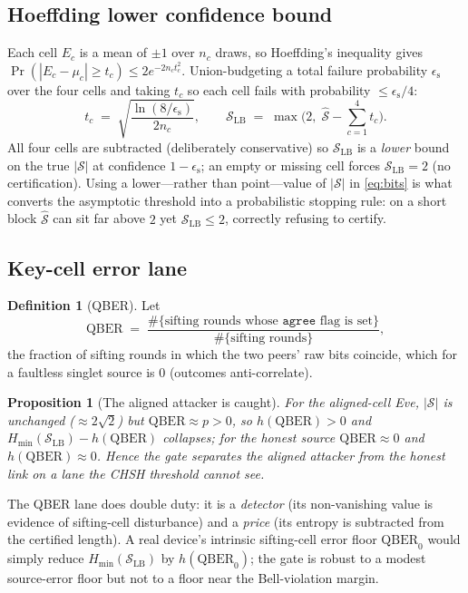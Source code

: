 \documentclass[11pt,a4paper]{article}
\newcommand{\CHSH}{\mathcal{S}}
\newcommand{\eps}{\epsilon}
\newcommand{\epsS}{\eps_{\mathrm{s}}}
\newcommand{\QBER}{\mathrm{QBER}}
\newcommand{\Hmin}{H_{\min}}
\newcommand{\SLB}{\mathcal{S}_{\mathrm{LB}}}
\newcommand{\bell}{2\sqrt{2}}
\theoremstyle{plain}
\newtheorem{proposition}[theorem]{Proposition}
\theoremstyle{definition}
\newtheorem{definition}[theorem]{Definition}
\begin{document}
\subsection{Hoeffding lower confidence bound}
Each cell $E_c$ is a mean of $\pm1$ over $n_c$ draws, so Hoeffding's inequality
gives $\Pr(|E_c - \mu_c| \ge t_c) \le 2e^{-2 n_c t_c^2}$. Union-budgeting a
total failure probability $\epsS$ over the four cells and taking $t_c$ so each
cell fails with probability $\le \epsS/4$:
\begin{equation}
t_c \;=\; \sqrt{\frac{\ln(8/\epsS)}{2 n_c}}, \qquad
\SLB \;=\; \max\!\Big(2,\; \widehat{\CHSH} - \sum_{c=1}^{4} t_c\Big).
\label{eq:slb}
\end{equation}
All four cells are subtracted (deliberately conservative) so $\SLB$ is a
\emph{lower} bound on the true $|\CHSH|$ at confidence $1-\epsS$; an empty or
missing cell forces $\SLB = 2$ (no certification). Using a lower---rather than
point---value of $|\CHSH|$ in \eqref{eq:bits} is what converts the asymptotic
threshold into a probabilistic stopping rule: on a short block $\widehat{\CHSH}$
can sit far above $2$ yet $\SLB \le 2$, correctly refusing to certify.

\subsection{Key-cell error lane}\label{sec:qber}
\begin{definition}[QBER]
Let
\[
\QBER \;=\; \frac{\#\{\text{sifting rounds whose } \texttt{agree}\text{ flag is set}\}}{\#\{\text{sifting rounds}\}},
\]
the fraction of sifting rounds in which the two peers' raw bits coincide,
which for a faultless singlet source is $0$ (outcomes anti-correlate).
\end{definition}
\begin{proposition}[The aligned attacker is caught]
\label{prop:qber}
For the aligned-cell Eve, $|\CHSH|$ is unchanged ($\approx\bell$) but
$\QBER \approx p > 0$, so $h(\QBER) > 0$ and $\Hmin(\SLB) - h(\QBER)$ collapses;
for the honest source $\QBER \approx 0$ and $h(\QBER)\approx 0$. Hence the gate
separates the aligned attacker from the honest link on a lane the CHSH
threshold cannot see.
\end{proposition}
The QBER lane does double duty: it is a \emph{detector} (its non-vanishing
value is evidence of sifting-cell disturbance) and a \emph{price} (its entropy
is subtracted from the certified length). A real device's intrinsic sifting-cell
error floor $\QBER_{0}$ would simply reduce $\Hmin(\SLB)$ by $h(\QBER_{0})$; the
gate is robust to a modest source-error floor but not to a floor near the
Bell-violation margin.
\end{document}
